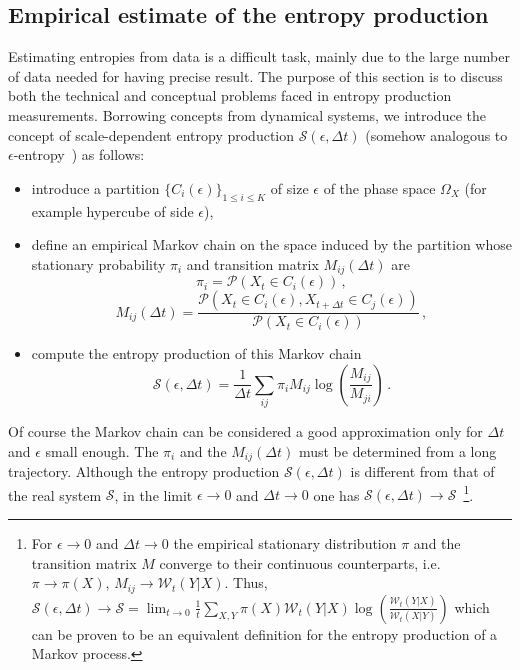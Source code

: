\documentclass[12pt]{iopart}
\newcommand{\lx} {\left}
\newcommand{\rx} {\right}
\newcommand{\eps} {\epsilon}
\newcommand{\cP} {\mathcal{P}}
\newcommand{\cW} {\mathcal{W}}
\newcommand{\cS} {\mathcal{S}}
\begin{document}
\subsection{Empirical estimate of the entropy production}
Estimating entropies from data is a difficult task, mainly due to the large number of data needed for having precise result. The purpose of this section is to discuss both the technical and conceptual problems faced in entropy production measurements. Borrowing concepts from dynamical systems, we introduce the concept of scale-dependent entropy production $\cS(\epsilon,\Delta t)$ (somehow analogous to $\epsilon$-entropy~\cite{abel2000exit,gaspard1993noise,boffetta2002predictability}) as follows:
\begin{itemize}
\item introduce a partition $\{C_i(\epsilon)\}_{1\le i \le K}$ of size $\epsilon$ of the phase space $\Omega_X$ (for example hypercube of side $\epsilon$),
\item define an empirical Markov chain on the space induced by the partition whose stationary probability $\pi_i$ and transition matrix $M_{ij}(\Delta t)$ are $$\pi_i=\cP(X_t\in C_i(\epsilon))\,,$$ $$M_{ij}(\Delta t)=\frac{\cP(X_t\in C_i(\epsilon),X_{t+\Delta t}\in C_j(\epsilon))}{\cP(X_t\in C_i(\epsilon))}\,,$$
\item compute the entropy production of this Markov chain $$\cS(\epsilon,\Delta t)=\frac{1}{\Delta t}\sum_{ij}\pi_iM_{ij}\log\lx(\frac{M_{ij}}{M_{ji}}\rx)\,.$$
\end{itemize}
Of course the Markov chain can be considered a good approximation only for $\Delta t$ and $\eps$ small enough.
The $\pi_i$ and the $M_{ij}(\Delta t)$ must be determined from a long trajectory.
Although the entropy production $\cS(\epsilon,\Delta t)$ is different from that of the real system $\cS$, in the limit $\epsilon \to 0$ and $\Delta t\to 0$ one has $\cS(\epsilon,\Delta t)\to\cS$~\footnote{For $\epsilon \to 0$ and $\Delta t\to 0$ the empirical stationary distribution $\pi$ and the transition matrix $M$ converge to their continuous counterparts, i.e. $\pi\to \pi(X)$, $M_{ij}\to \cW_t(Y|X)$. Thus, $\cS(\epsilon,\Delta t)\to \cS=\lim_{t\to 0} \frac{1}{t}\sum_{X,Y}\pi(X)\cW_t(Y|X)\log\lx(\frac{\cW_t(Y|X)}{\cW_t(X|Y)}\rx)$ which can be proven to be an equivalent definition for the entropy production of a Markov process.}.%
\end{document}
